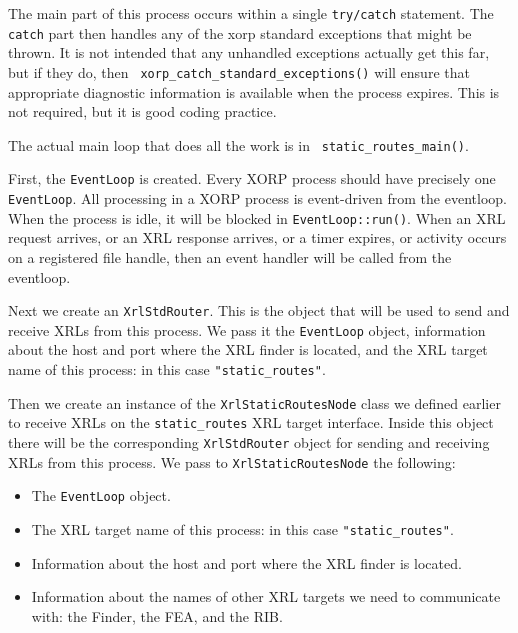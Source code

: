 \documentclass[11pt]{article}
\newcommand{\stt}{\tt\small}
\newcommand{\SR}{{\tt\small static\_routes}\xspace}
\begin{document}
The main part of this process occurs within a single {\stt try/catch}
statement.  The {\stt catch} part then handles any of the xorp standard
exceptions that might be thrown.  It is not intended that any
unhandled exceptions actually get this far, but if they do, then {\stt
xorp\_catch\_standard\_exceptions()} will ensure that appropriate
diagnostic information is available when the process expires.  This is
not required, but it is good coding practice.

The actual main loop that does all the work is in {\stt
static\_routes\_main()}.

First, the {\tt EventLoop} is created.  Every XORP process should have
precisely one {\tt EventLoop}.  All processing in a XORP process is
event-driven from the eventloop.  When the process is idle, it will be
blocked in {\stt EventLoop::run()}.  When an XRL request arrives, or
an XRL response arrives, or a timer expires, or activity occurs on a
registered file handle, then an event handler will be called from the
eventloop.

Next we create an {\stt XrlStdRouter}.  This is the object that will
be used to send and receive XRLs from this process.  We pass it the
{\stt EventLoop} object, information about the host and port where the
XRL finder is located, and the XRL target name of this process: in
this case {\stt "static\_routes"}.

Then we create an instance of the {\stt XrlStaticRoutesNode} class we
defined earlier to receive XRLs on the \SR XRL target interface.
Inside this object there will be the corresponding {\stt XrlStdRouter}
object for sending and receiving XRLs from this process.
We pass to {\stt XrlStaticRoutesNode} the following:

\begin{itemize}

  \item The {\stt EventLoop} object.

  \item The XRL target name of this process: in this case
  {\stt "static\_routes"}.

  \item Information about the host and port where the XRL finder is located.

  \item Information about the names of other XRL targets we need to
  communicate with: the Finder, the FEA, and the RIB.

\end{itemize}
\end{document}
